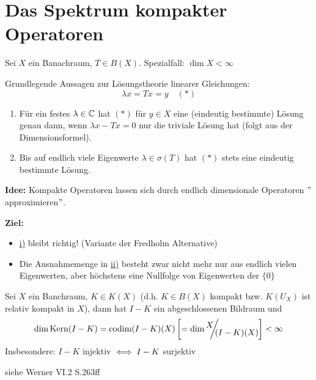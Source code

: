 
\section{Das Spektrum kompakter Operatoren}



Sei $X$ ein Banachraum, $T \in B(X)$. Spezialfall: $\dim X < \infty$

Grundlegende Aussagen zur Lösungstheorie linearer Gleichungen:
	\[ \lambda x = T x = y \quad (*) \label{eq:14.0-linereGleichung} \]
\begin{enumerate}[label=\roman*\upshape)] 
	\label{item:14.0i}
	\item Für ein festes $\lambda \in \mathbb{C}$ hat \hyperref[eq:14.0-linereGleichung]{$(*)$} für $y \in X$ eine (eindeutig bestimmte) Lösung genau dann, wenn $\lambda x - T x = 0$ nur die triviale Lösung hat (folgt aus der Dimensionsformel).
	\label{item:14.0ii}
	\item Bis auf endlich viele Eigenwerte $\lambda \in \sigma(T)$ hat \hyperref[eq:14.0-linereGleichung]{$(*)$} stets eine eindeutig bestimmte Lösung.
\end{enumerate}

\textbf{Idee:} Kompakte Operatoren lassen sich durch endlich dimensionale Operatoren $"$approximieren$"$.

\textbf{Ziel:}
\begin{itemize}
	\item \hyperref[item:14.0i]{i)} bleibt richtig! (Variante der Fredholm Alternative)
	\item Die Ausnahmemenge in \hyperref[item:14.0ii]{ii)} besteht zwar nicht mehr nur aus endlich vielen Eigenwerten, aber höchstens eine Nullfolge von Eigenwerten der $\{ 0 \}$
\end{itemize}

\begin{satz} \label{satz:14.1}
	Sei $X$ ein Banchraum, $K \in K(X)$ (d.h. $K \in B(X)$ kompakt bzw. $K(U_{X})$ ist relativ kompakt in $X$), dann hat $I - K$ ein abgeschlossenen Bildraum und 
		\[ \dim \kernn(I  - K) = \operatorname{codim}(I - K)(X) \left[ = \dim \QR{ X }{ (I - K)(X) }  \right] < \infty \]
		Insbesondere: $I - K$ injektiv $\iff I - K$ surjektiv
\end{satz}

\begin{beweis}
	siehe Werner VI.2 S.263ff%
\end{beweis}


